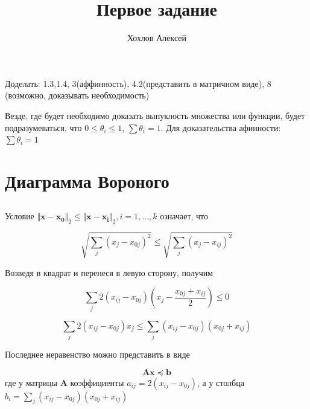 
\title{Первое задание}
\author{
	Хохлов Алексей \\
}


	\maketitle
	
	Доделать: 1.3,1.4, 3(аффинность), 4.2(представить в матричном виде), 8 (возможно, доказывать необходимость)
	
	Везде, где будет необходимо доказать выпуклость множества или функции, будет
	подразумеваться, что $0 \leqslant \theta_i \leqslant 1$, $\sum \theta_i = 1$.
	Для доказательства афинности:$\sum \theta_i = 1$
	
	\section{Диаграмма Вороного}
	
	\subsection{}
	
	Условие $\Vert \mathbf{x} - \mathbf{x_0} \Vert_2 \leqslant \Vert \mathbf{x} -
	\mathbf{x_i} \Vert_2 , i=1,...,k$ означает, что
	
	\begin{equation}
	\sqrt {\sum_j (x_j-x_{0j})^2 }\leqslant \sqrt {\sum_j (x_j-x_{ij})^2 }
	\end{equation}
	
	Возведя в квадрат и перенеся в левую сторону, получим
	
	\begin{equation}
	\sum_j 2(x_{ij}-x_{0j})(x_j - \frac{x_{0j}+x_{ij}}{2}) \leqslant 0
	\end{equation}
	
	\begin{equation}
	\label{13}
	\sum_j 2(x_{ij}-x_{0j})x_j \leqslant  	\sum_j (x_{ij}-x_{0j}) (x_{0j}+x_{ij}) 
	\end{equation}
	
	Последнее неравенство можно представить в виде
	
	\begin{equation}
	\mathbf{A} \mathbf{x} \preceq \mathbf{b}
	\end{equation}
	где у матрицы $\mathbf{A}$ коэффициенты $ a_{ij} = 2(x_{ij}-x_{0j})$, а у
	столбца $ b_i = \sum\limits_{j} (x_{ij}-x_{0j}) (x_{0j}+x_{ij}) $
	
